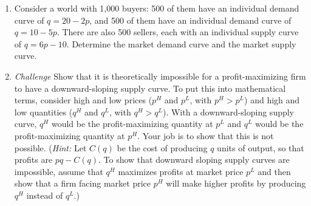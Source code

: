 \begin{enumerate}

\item Consider a world with 1,000 buyers: 500 of them have an individual demand curve of $q=20-2p$, and 500 of them have an individual demand curve of $q=10-5p$. There are also 500 sellers, each with an individual supply curve of $q=6p-10$. Determine the market demand curve and the market supply curve.









\item \label{nodownsupply} \emph{Challenge} Show that it is theoretically impossible for a profit-maximizing firm to have a downward-sloping supply curve. To put this into mathematical terms, consider high and low prices ($p^H$ and $p^L$, with $p^H>p^L$) and high and low quantities ($q^H$ and $q^L$, with $q^H>q^L$). With a downward-sloping supply curve, $q^H$ would be the profit-maximizing quantity at $p^L$ and $q^L$ would be the profit-maximizing quantity at $p^H$. Your job is to show that this is not possible. (\emph{Hint:} Let $C(q)$ be the cost of producing $q$ units of output, so that profits are $pq-C(q)$. To show that downward sloping supply curves are impossible, assume that $q^H$ maximizes profits at market price $p^L$ and then show that a firm facing market price $p^H$ will make higher profits by producing $q^H$ instead of $q^L$.)













\end{enumerate}
